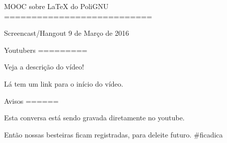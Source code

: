 MOOC sobre LaTeX do PoliGNU
===========================

Screencast/Hangout     9 de Março de 2016


Youtubers
=========

Veja a descrição do vídeo!

Lá tem um link para o início do vídeo.


Avisos
======

Esta conversa está sendo gravada
diretamente no youtube.

Então nossas besteiras ficam registradas,
para deleite futuro. #ficadica

